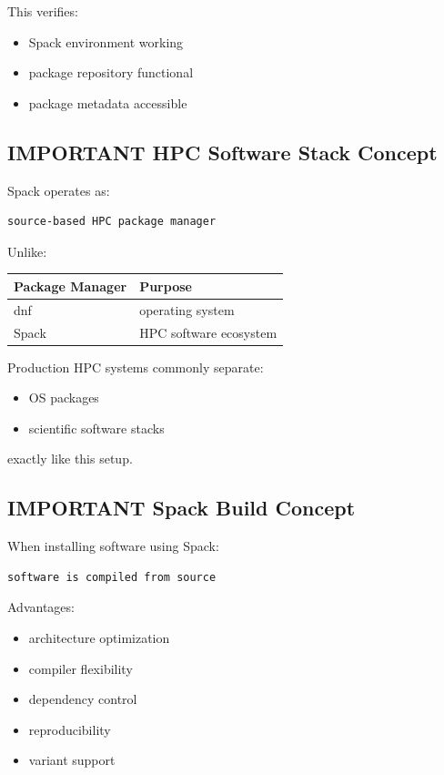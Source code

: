 \documentclass[11pt]{article}
\begin{document}
This verifies:

\begin{itemize}
\item Spack environment working
\item package repository functional
\item package metadata accessible
\end{itemize}
\subsection{IMPORTANT HPC Software Stack Concept}
\label{sec:orga6d8c40}

Spack operates as:

\begin{verbatim}
source-based HPC package manager
\end{verbatim}

Unlike:

\begin{center}
\begin{tabular}{ll}
Package Manager & Purpose\\
\hline
dnf & operating system\\
Spack & HPC software ecosystem\\
\end{tabular}
\end{center}

Production HPC systems commonly separate:

\begin{itemize}
\item OS packages
\item scientific software stacks
\end{itemize}

exactly like this setup.
\subsection{IMPORTANT Spack Build Concept}
\label{sec:org5a233e5}

When installing software using Spack:

\begin{verbatim}
software is compiled from source
\end{verbatim}

Advantages:

\begin{itemize}
\item architecture optimization
\item compiler flexibility
\item dependency control
\item reproducibility
\item variant support
\end{itemize}
\end{document}
